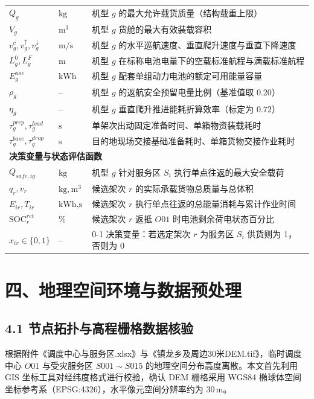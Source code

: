 \documentclass[withoutpreface,bwprint]{format}
\begin{document}
\begin{table}[H]
\begin{tabularx}{\textwidth}{p{3.2cm} p{2.2cm} X}
$Q_g$ & $\text{kg}$ & 机型 $g$ 的最大允许载货质量（结构载重上限） \\
$V_g$ & $\text{m}^3$ & 机型 $g$ 货舱的最大有效装载容积 \\
$v_g^c, v_g^\uparrow, v_g^\downarrow$ & $\text{m/s}$ & 机型 $g$ 的水平巡航速度、垂直爬升速度与垂直下降速度 \\
$L_g^0, L_g^F$ & $\text{m}$ & 机型 $g$ 在标称电池电量下的空载标准航程与满载标准航程 \\
$E_g^{use}$ & $\text{kWh}$ & 机型 $g$ 配套单组动力电池的额定可用能量容量 \\
$\rho_g$ & -- & 机型 $g$ 的返航安全预留电量比例（基准值取 $0.20$） \\
$\eta_g$ & -- & 机型 $g$ 垂直爬升推进能耗折算效率（标定为 $0.72$） \\
$\tau_g^{prep}, \tau_g^{load}$ & $\text{s}$ & 单架次出动固定准备时间、单箱物资装载耗时 \\
$\tau_g^{base}, \tau_g^{drop}$ & $\text{s}$ & 目的地现场交接基础准备耗时、单箱货物交接作业耗时 \\
\midrule
\multicolumn{3}{l}{\textbf{决策变量与状态评估函数}} \\
$Q_{safe, ig}$ & $\text{kg}$ & 机型 $g$ 针对服务区 $S_i$ 执行单点往返的最大安全载荷 \\
$q_r, v_r$ & $\text{kg}, \text{m}^3$ & 候选架次 $r$ 的实际承载货物总质量与总体积 \\
$E_{ir}, T_{ir}$ & $\text{kWh}, \text{s}$ & 候选架次 $r$ 执行单点往返的总能量消耗与累计作业时间 \\
$\text{SOC}_r^{ret}$ & $\%$ & 候选架次 $r$ 返抵 $O01$ 时电池剩余荷电状态百分比 \\
$x_{ir} \in \{0, 1\}$ & -- & 0-1 决策变量：若选定架次 $r$ 为服务区 $S_i$ 供货则为 1，否则为 0 \\
\bottomrule
\end{tabularx}
\end{table}



\section{四、地理空间环境与数据预处理}

\subsection{4.1 节点拓扑与高程栅格数据核验}
根据附件《调度中心与服务区.xlsx》与《镇龙乡及周边30米DEM.tif》，临时调度中心 $O01$ 与受灾服务区 $S001\sim S015$ 的地理空间分布高度离散。本文首先利用 GIS 坐标工具对经纬度格式进行校验，确认 DEM 栅格采用 WGS84 椭球体空间坐标参考系（EPSG:4326），水平像元空间分辨率约为 $30\,\text{m}$。
\end{document}
